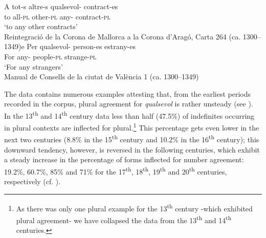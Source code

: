 \documentclass[output=paper,colorlinks,citecolor=brown]{langscibook}
\begin{document}
\ea \label{ex:ka12}
\ea \gll A tot-s altre-s qualsevol-{\emptyset} contract-es\\
        to all-\textsc{pl} other-\textsc{pl} any-{\emptyset} contract-\textsc{pl}\\
     \glt ‘to any other contracts’\\
        Reintegració de la Corona de Mallorca a la Corona d'Aragó, Carta 264 (ca. 1300--1349)e
\ex \gll Per qualsevol-{\emptyset} person-es estrany-es\\
        For any-{\emptyset} people-\textsc{pl} strange-\textsc{pl}\\
     \glt   ‘For any strangers’\\
     Manual de Consells de la ciutat de València 1 (ca. 1300--1349)
    \z
\z

The data contains numerous examples attesting that, from the earliest periods recorded in the corpus, plural agreement for \textit{qualsevol} is rather unsteady (see ). In the 13\textsuperscript{th} and 14\textsuperscript{th} century data less than half (47.5\%) of indefinites occurring in plural contexts are inflected for plural.\footnote{As there was only one plural example for the 13\textsuperscript{th} century -which exhibited plural agreement- we have collapsed the data from the 13\textsuperscript{th} and 14\textsuperscript{th} centuries.} This percentage gets even lower in the next two centuries (8.8\% in the 15\textsuperscript{th} century and 10.2\% in the 16\textsuperscript{th} century); this downward tendency, however, is reversed in the following centuries, which exhibit a steady increase in the percentage of forms inflected for number agreement: 19.2\%, 60.7\%, 85\% and 71\% for the 17\textsuperscript{th}, 18\textsuperscript{th}, 19\textsuperscript{th} and 20\textsuperscript{th} centuries, respectively (cf. ).
\end{document}
